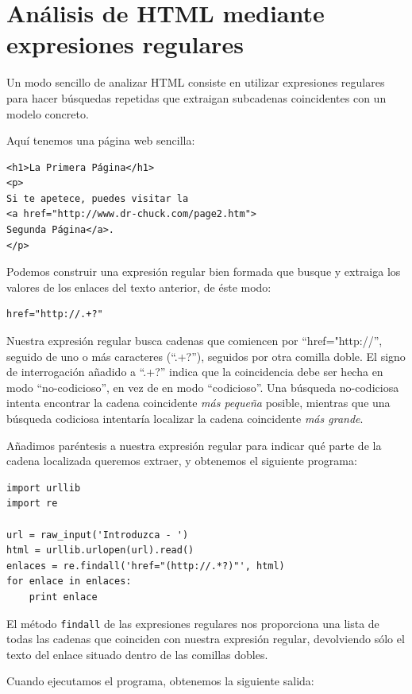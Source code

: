 \section{Análisis de HTML mediante expresiones regulares}

Un modo sencillo de analizar HTML consiste en utilizar expresiones regulares para
hacer búsquedas repetidas que extraigan subcadenas coincidentes con un modelo concreto.

Aquí tenemos una página web sencilla:

\beforeverb
\begin{verbatim}
<h1>La Primera Página</h1>
<p>
Si te apetece, puedes visitar la
<a href="http://www.dr-chuck.com/page2.htm">
Segunda Página</a>.
</p>
\end{verbatim}
\afterverb
%
Podemos construir una expresión regular bien formada que busque
y extraiga los valores de los enlaces del texto anterior, de éste modo:

\beforeverb
\begin{verbatim}
href="http://.+?"
\end{verbatim}
\afterverb
%
Nuestra expresión regular busca cadenas que comiencen por
``href="http://'', seguido de uno o más caracteres
(``.+?''), seguidos por otra comilla doble. El signo de interrogación
añadido a ``.+?'' indica que la coincidencia debe ser hecha
en modo ``no-codicioso'', en vez de en modo ``codicioso''.
Una búsqueda no-codiciosa intenta encontrar la cadena coincidente
{\em más pequeña} posible, mientras que una búsqueda codiciosa intentaría
localizar la cadena coincidente {\em más grande}.

Añadimos paréntesis a nuestra expresión regular para indicar
qué parte de la cadena localizada queremos extraer, y
obtenemos el siguiente programa:

\beforeverb
\begin{verbatim}
import urllib
import re

url = raw_input('Introduzca - ')
html = urllib.urlopen(url).read()
enlaces = re.findall('href="(http://.*?)"', html)
for enlace in enlaces:
    print enlace
\end{verbatim}
\afterverb
%
El método {\tt findall} de las expresiones regulares nos proporciona una lista de todas
las cadenas que coinciden con nuestra expresión regular, devolviendo sólo
el texto del enlace situado dentro de las comillas dobles.

Cuando ejecutamos el programa, obtenemos la siguiente salida:

